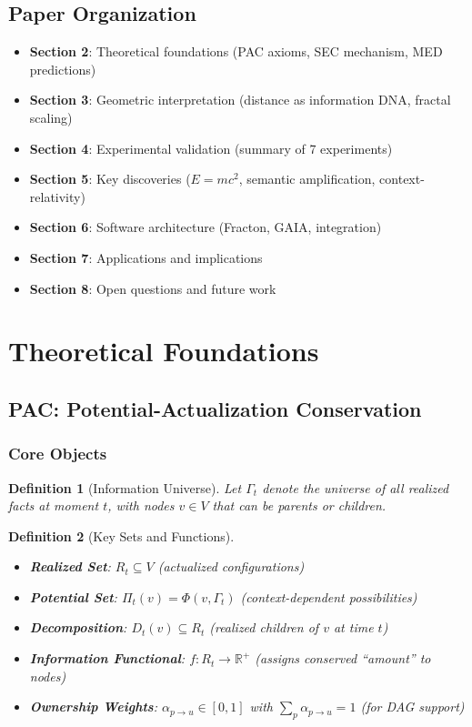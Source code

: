 \documentclass[11pt,a4paper]{article}
\newtheorem{definition}{Definition}
\newcommand{\R}{\mathbb{R}}
\begin{document}
\subsection{Paper Organization}

\begin{itemize}
    \item \textbf{Section 2}: Theoretical foundations (PAC axioms, SEC mechanism, MED predictions)
    \item \textbf{Section 3}: Geometric interpretation (distance as information DNA, fractal scaling)
    \item \textbf{Section 4}: Experimental validation (summary of 7 experiments)
    \item \textbf{Section 5}: Key discoveries ($E=mc^2$, semantic amplification, context-relativity)
    \item \textbf{Section 6}: Software architecture (Fracton, GAIA, integration)
    \item \textbf{Section 7}: Applications and implications
    \item \textbf{Section 8}: Open questions and future work
\end{itemize}

\section{Theoretical Foundations}

\subsection{PAC: Potential-Actualization Conservation}

\subsubsection{Core Objects}

\begin{definition}[Information Universe]
Let $\Gamma_t$ denote the universe of all realized facts at moment $t$, with nodes $v \in V$ that can be parents or children.
\end{definition}

\begin{definition}[Key Sets and Functions]
\begin{itemize}
    \item \textbf{Realized Set}: $R_t \subseteq V$ (actualized configurations)
    \item \textbf{Potential Set}: $\Pi_t(v) = \Phi(v, \Gamma_t)$ (context-dependent possibilities)
    \item \textbf{Decomposition}: $D_t(v) \subseteq R_t$ (realized children of $v$ at time $t$)
    \item \textbf{Information Functional}: $f: R_t \to \R^+$ (assigns conserved ``amount'' to nodes)
    \item \textbf{Ownership Weights}: $\alpha_{p \to u} \in [0,1]$ with $\sum_p \alpha_{p \to u} = 1$ (for DAG support)
\end{itemize}
\end{definition}
\end{document}
